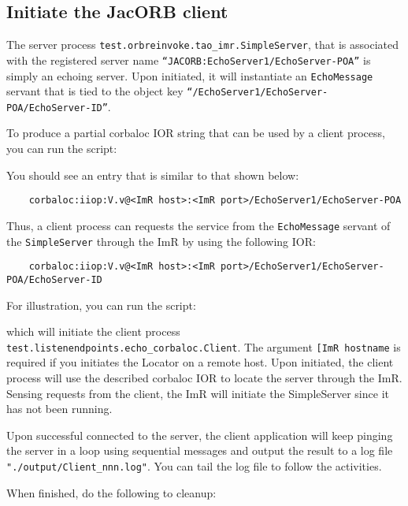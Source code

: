 \subsection{Initiate the JacORB client}

The server process {\tt test.orbreinvoke.tao\_imr.SimpleServer},  that is
associated with the registered server name
{\tt “JACORB:EchoServer1/EchoServer-POA”} is simply an echoing server.
Upon initiated, it will instantiate an {\tt EchoMessage} servant that is tied to
the object key {\tt “/EchoServer1/EchoServer-POA/EchoServer-ID”}.

To produce a partial corbaloc IOR string that can be used by a client process,
you can run the script:


You should see an entry that is similar to that shown below:

\small{
\begin{verbatim}
    corbaloc:iiop:V.v@<ImR host>:<ImR port>/EchoServer1/EchoServer-POA
\end{verbatim}
}

Thus, a client process can requests the service from the {\tt EchoMessage} servant
of the {\tt SimpleServer} through the ImR by using the following IOR:

\small{
\begin{verbatim}
    corbaloc:iiop:V.v@<ImR host>:<ImR port>/EchoServer1/EchoServer-POA/EchoServer-ID
\end{verbatim}
}

For illustration, you can run the script:


which will initiate the client process {\tt test.listenendpoints.echo_corbaloc.Client}.
The argument {\tt [ImR hostname} is required if you initiates the Locator on a
remote host.  Upon initiated, the client process will use the described corbaloc
IOR to locate the server through the ImR.  Sensing requests from the client,
the ImR will initiate the SimpleServer since it has not been running.

Upon successful connected to the server, the client application will keep pinging
the server in a loop using sequential messages and output the result to a log file
{\tt"./output/Client\_nnn.log"}.  You can tail the log file to follow the activities.

When finished, do the following to cleanup:

